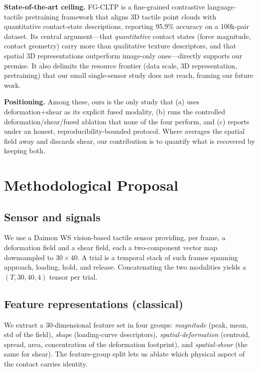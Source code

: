\documentclass[conference]{IEEEtran}
\begin{document}
\textbf{State-of-the-art ceiling.} FG-CLTP \cite{fgcltp2025} is a fine-grained
contrastive language--tactile pretraining framework that aligns 3D tactile point
clouds with quantitative contact-state descriptions, reporting 95.9\% accuracy
on a 100k-pair dataset. Its central argument---that \emph{quantitative} contact
states (force magnitude, contact geometry) carry more than qualitative texture
descriptors, and that spatial 3D representations outperform image-only
ones---directly supports our premise. It also delimits the resource frontier
(data scale, 3D representation, pretraining) that our small single-sensor study
does not reach, framing our future work.

\textbf{Positioning.} Among these, ours is the only study that (a) uses
deformation+shear as its explicit fused modality, (b) runs the controlled
deformation/shear/fused ablation that none of the four perform, and (c) reports
under an honest, reproducibility-bounded protocol. Where \cite{amin2023} averages
the spatial field away and \cite{liao2025} discards shear, our contribution is to
quantify what is recovered by keeping both.

\section{Methodological Proposal}
\subsection{Sensor and signals}
We use a Daimon WS vision-based tactile sensor providing, per frame, a
deformation field and a shear field, each a two-component vector map downsampled
to $30\times40$. A trial is a temporal stack of such frames spanning approach,
loading, hold, and release. Concatenating the two modalities yields a
$(T,30,40,4)$ tensor per trial.

\subsection{Feature representations (classical)}
We extract a 30-dimensional feature set in four groups: \emph{magnitude}
(peak, mean, std of the field), \emph{shape} (loading-curve descriptors),
\emph{spatial-deformation} (centroid, spread, area, concentration of the
deformation footprint), and \emph{spatial-shear} (the same for shear). The
feature-group split lets us ablate which physical aspect of the contact carries
identity.
\end{document}
